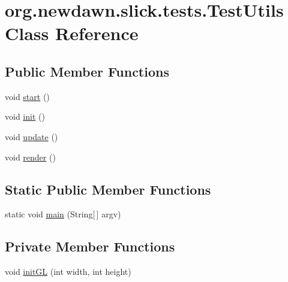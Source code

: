 \hypertarget{classorg_1_1newdawn_1_1slick_1_1tests_1_1_test_utils}{}\section{org.\+newdawn.\+slick.\+tests.\+Test\+Utils Class Reference}
\label{classorg_1_1newdawn_1_1slick_1_1tests_1_1_test_utils}
\subsection*{Public Member Functions}
\begin{DoxyCompactItemize}
\item 
void \mbox{\hyperlink{classorg_1_1newdawn_1_1slick_1_1tests_1_1_test_utils_a76af694d0bc5733badd0d91d4b089bb0}{start}} ()
\item 
void \mbox{\hyperlink{classorg_1_1newdawn_1_1slick_1_1tests_1_1_test_utils_ac7ed064f8a58185047e1ef6870382747}{init}} ()
\item 
void \mbox{\hyperlink{classorg_1_1newdawn_1_1slick_1_1tests_1_1_test_utils_a109c078a4703d9f559df11450b3e6754}{update}} ()
\item 
void \mbox{\hyperlink{classorg_1_1newdawn_1_1slick_1_1tests_1_1_test_utils_ad588dc36052b23fc284e1f9cc3baf498}{render}} ()
\end{DoxyCompactItemize}
\subsection*{Static Public Member Functions}
\begin{DoxyCompactItemize}
\item 
static void \mbox{\hyperlink{classorg_1_1newdawn_1_1slick_1_1tests_1_1_test_utils_a03e6ed0e15f3f86b48678943e08a34a5}{main}} (String\mbox{[}$\,$\mbox{]} argv)
\end{DoxyCompactItemize}
\subsection*{Private Member Functions}
\begin{DoxyCompactItemize}
\item 
void \mbox{\hyperlink{classorg_1_1newdawn_1_1slick_1_1tests_1_1_test_utils_aa258422cf2a025183e44eb3a13b66e3f}{init\+GL}} (int width, int height)
\end{DoxyCompactItemize}
